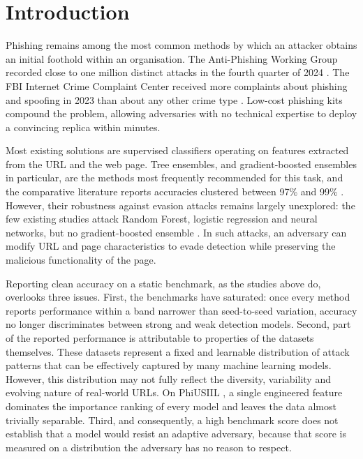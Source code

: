 \documentclass[runningheads]{llncs}
\begin{document}
\section{Introduction}
\label{sec:intro}

Phishing remains among the most common methods by which an attacker obtains an
initial foothold within an organisation. The Anti-Phishing Working Group recorded
close to one million distinct attacks in the fourth quarter of 2024
\cite{apwg2024}. The FBI Internet Crime Complaint Center received more
complaints about phishing and spoofing in 2023 than about any other crime type
\cite{ic32023}. Low-cost phishing kits compound the problem, allowing adversaries
with no technical expertise to deploy a convincing replica within minutes.

Most existing solutions are supervised classifiers operating on features
extracted from the URL and the web page. Tree ensembles, and gradient-boosted
ensembles in particular, are the methods most frequently recommended for this
task, and the comparative literature reports accuracies clustered between 97\%
and 99\% \cite{hannousse2021,prasad2024}. However, their robustness against
evasion attacks remains largely unexplored: the few existing studies attack Random
Forest, logistic regression and neural networks, but no gradient-boosted
ensemble \cite{apruzzese2022,montaruli2023}. In such attacks, an adversary can
modify URL and page characteristics to evade detection while preserving the
malicious functionality of the page.

Reporting clean accuracy on a static benchmark, as the studies above do,
overlooks three issues. First, the benchmarks have saturated: once every method
reports performance within a band narrower than seed-to-seed variation, accuracy
no longer discriminates between strong and weak detection models. Second, part of the reported performance is attributable to properties of the
datasets themselves. These datasets represent a fixed and learnable
distribution of attack patterns that can be effectively captured by many machine
learning models. However, this distribution may not fully reflect the diversity,
variability and evolving nature of real-world URLs. On PhiUSIIL \cite{prasad2024}, a single engineered feature dominates the
importance ranking of every model and leaves the data almost trivially separable. Third, and
consequently, a high benchmark score does not establish that a model would resist
an adaptive adversary, because that score is measured on a distribution the
adversary has no reason to respect.
\end{document}
